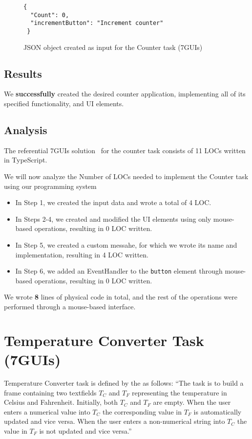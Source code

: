 \begin{figure}[htbp]
	\caption{JSON object created as input for the Counter task (7GUIs)}
	\label{fig:counter-json}
	\begin{lstlisting}
{
  "Count": 0,
  "incrementButton": "Increment counter"
 }
    \end{lstlisting}
\end{figure}
\medskip
\subsection{Results}
We \textbf{successfully} created the desired counter application, implementing all of its specified functionality, and UI elements.
\medskip
\subsection{Analysis}
The referential 7GUIs solution~\cite{7guis-React-TypeScript-MobX/src/app/guis/counter.tsx} for the counter task consists of 11 LOCs written in TypeScript.

We will now analyze the Number of LOCs needed to implement the Counter task using our programming system
\begin{itemize}
	\item In Step 1, we created the input data and wrote a total of 4 LOC.
	\item   In Steps 2-4, we created and modified the UI elements using only mouse-based operations, resulting in 0 LOC written.
	\item   In Step 5, we created a custom messahe, for which we wrote its name and implementation, resulting in 4 LOC written.
	\item   In Step 6, we added an EventHandler to the \texttt{button} element through mouse-based operations, resulting in 0 LOC written.
\end{itemize}
\noindent We wrote \textbf{8} lines of physical code in total, and the rest of the operations were performed through a mouse-based interface.







\medskip
\section{Temperature Converter Task (7GUIs)}
Temperature Converter task is defined by the \citet{7GUIs-web} as follows: ``The task is to build a frame containing two textfields $T_C$ and $T_F$ representing the temperature in Celsius and Fahrenheit. Initially, both $T_C$ and $T_F$ are empty.
When the user enters a numerical value into $T_C$ the corresponding value in $T_F$ is automatically updated and vice versa. When the user enters a non-numerical string into $T_C$ the value in $T_F$ is not updated and vice versa.''
\medskip
